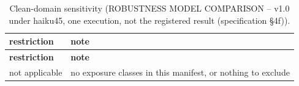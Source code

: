 \begingroup\footnotesize
\begin{longtable}{>{\raggedright\arraybackslash}p{126.4pt}>{\raggedright\arraybackslash}p{304.6pt}}
\caption{Clean-domain sensitivity (ROBUSTNESS MODEL COMPARISON -- v1.0 under haiku45, one execution, not the registered result (specification §4f)).} \\
\toprule
\textbf{restriction} & \textbf{note} \\
\midrule
\endfirsthead
\toprule
\textbf{restriction} & \textbf{note} \\
\midrule
\endhead
\bottomrule
\endfoot
not applicable & no exposure classes in this manifest, or nothing to exclude \\
\end{longtable}
\endgroup
